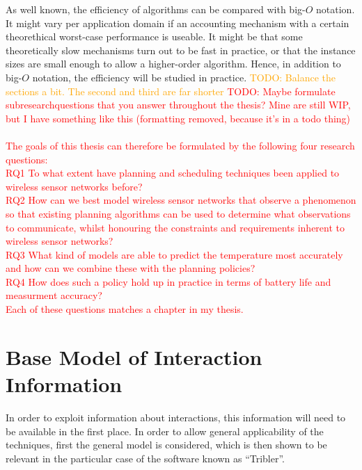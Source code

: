 \documentclass[a4paper,11pt]{book}
\newcommand\musthave[1]{\textcolor{red}{TODO: #1}}
\newcommand\nicetohave[1]{\textcolor{orange}{TODO: #1}}
\theoremstyle{definition}
\begin{document}
As well known, the efficiency of algorithms can be compared with big-$O$ notation.
It might vary per application domain if an accounting mechanism with a certain
theorethical worst-case performance is useable. It might be that some
theoretically slow mechanisms turn out to be fast in practice, or that the
instance sizes are small enough to allow a higher-order algorithm. Hence,
in addition to big-$O$ notation, the efficiency will be studied in practice.
\nicetohave{Balance the sections a bit. The second and third are far shorter}
\musthave{Maybe formulate subresearchquestions that you answer throughout the thesis? 
Mine are still WIP, but I have something like this (formatting removed, because it's in a todo thing)\\\hfill\\
The goals of this thesis can therefore be formulated by the following four research questions:                           \\
  RQ1 To what extent have planning and scheduling techniques been applied to wireless sensor networks before?     \\
  RQ2 How can we best model wireless sensor networks that observe a phenomenon so that existing planning algorithms
  can be used to determine what observations to communicate, whilst honouring the constraints and requirements inherent  
  to wireless sensor networks?                                                                                           \\
  RQ3 What kind of models are able to predict the temperature most accurately and how can we combine these with   
  the planning policies?                                                                                                 \\
  RQ4 How does such a policy hold up in practice in terms of battery life and measurment accuracy?                \\
Each of these questions matches a chapter in my thesis.
}


\chapter{Base Model of Interaction Information}

In order to exploit information about interactions, this information will need to be
available in the first place. In order to allow general applicability of the
techniques, first the general model is considered, which is then shown to be
relevant in the particular case of the software known as ``Tribler''.
\end{document}
